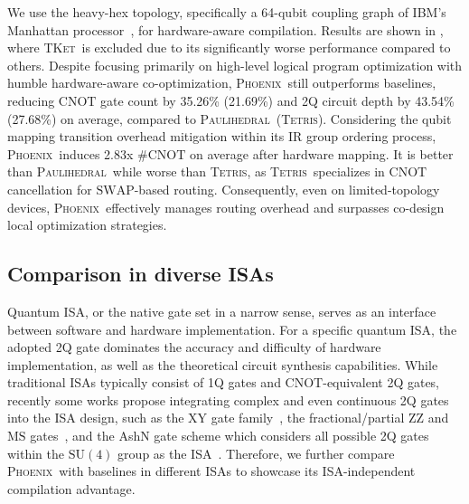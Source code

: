 \documentclass[conference,9pt]{IEEEtran}
\newcommand{\phoenix}{\textsc{Phoenix}}
\newcommand{\tket}{\textsc{TKet}}
\newcommand{\tetris}{\textsc{Tetris}}
\newcommand{\paulihedral}{\textsc{Paulihedral}}
\newcommand{\SWAP}{\mathrm{SWAP}}
\newcommand{\CNOT}{\mathrm{CNOT}}
\newcommand{\SUfour}{\mathrm{SU}(4)}
\begin{document}
    We use the heavy-hex topology, specifically a 64-qubit coupling graph of IBM's Manhattan processor~\cite{mooney2021whole}, for hardware-aware compilation. Results are shown in , where \tket\ is excluded due to its significantly worse performance compared to others. Despite focusing primarily on high-level logical program optimization with humble hardware-aware co-optimization, \phoenix\ still outperforms baselines, reducing $\CNOT$ gate count by 35.26\% (21.69\%) and 2Q circuit depth by 43.54\% (27.68\%) on average, compared to \paulihedral\ (\tetris). Considering the qubit mapping transition overhead mitigation within its IR group ordering process, \phoenix\ induces 2.83x \#$ \CNOT $ on average after hardware mapping. It is better than \paulihedral\ while worse than \tetris, as \tetris\ specializes in $\CNOT$ cancellation for $ \SWAP $-based routing. Consequently, even on limited-topology devices, \phoenix\ effectively manages routing overhead and surpasses co-design local optimization strategies.



\subsection{Comparison in diverse ISAs}


    \begin{table}[tbp]
        \centering
        \caption{Comparison for diverse ISAs with all-to-all and limited topology.}
        \scalebox{0.9}{
            
        }
        \label{tab:isa}
    \end{table}

    Quantum ISA, or the native gate set in a narrow sense, serves as an interface between software and hardware implementation. For a specific quantum ISA, the adopted 2Q gate dominates the accuracy and difficulty of hardware implementation, as well as the theoretical circuit synthesis capabilities. While traditional ISAs typically consist of 1Q gates and $\CNOT$-equivalent 2Q gates, recently some works propose integrating complex and even continuous 2Q gates into the ISA design, such as the $\mathrm{XY}$ gate family~\cite{abrams2020implementation}, the fractional/partial $\mathrm{ZZ}$ and $\mathrm{MS}$ gates~\cite{ibmFractionalGates,ionqPartialGates}, and the AshN gate scheme which considers all possible 2Q gates within the $\SUfour$ group as the ISA~\cite{chen2024one}.    
    Therefore, we further compare \phoenix\ with baselines in different ISAs to showcase its ISA-independent compilation advantage.
    
\end{document}
